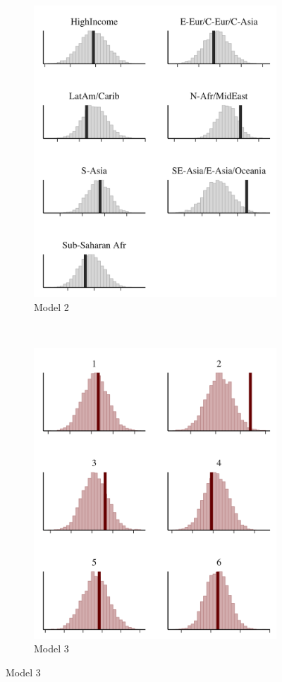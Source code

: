 \documentclass[t]{beamer}
\begin{document}
\begin{frame}
\begin{figure}
\begin{subfigure}{.31\textwidth}
\includegraphics[width=\textwidth]{ppc_med_grouped2.png}
\caption{Model 2}
\end{subfigure}
~
\begin{subfigure}{.31\textwidth}
\includegraphics[width=\textwidth]{ppc_med_grouped3.png}
\caption{Model 3}
\end{subfigure}


\end{figure}
\end{frame}
\end{document}
